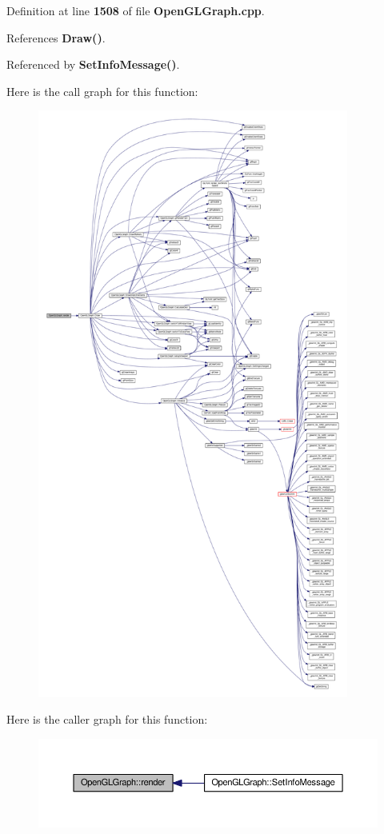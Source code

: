 Definition at line {\bf 1508} of file {\bf Open\+G\+L\+Graph.\+cpp}.



References {\bf Draw()}.



Referenced by {\bf Set\+Info\+Message()}.



Here is the call graph for this function\+:
\nopagebreak
\begin{figure}[H]
\begin{center}
\leavevmode
\includegraphics[height=550pt]{d9/d73/classOpenGLGraph_a3ec7e57bd2baa9fffbd14a0fb952e8a8_cgraph}
\end{center}
\end{figure}




Here is the caller graph for this function\+:
\nopagebreak
\begin{figure}[H]
\begin{center}
\leavevmode
\includegraphics[width=350pt]{d9/d73/classOpenGLGraph_a3ec7e57bd2baa9fffbd14a0fb952e8a8_icgraph}
\end{center}
\end{figure}


